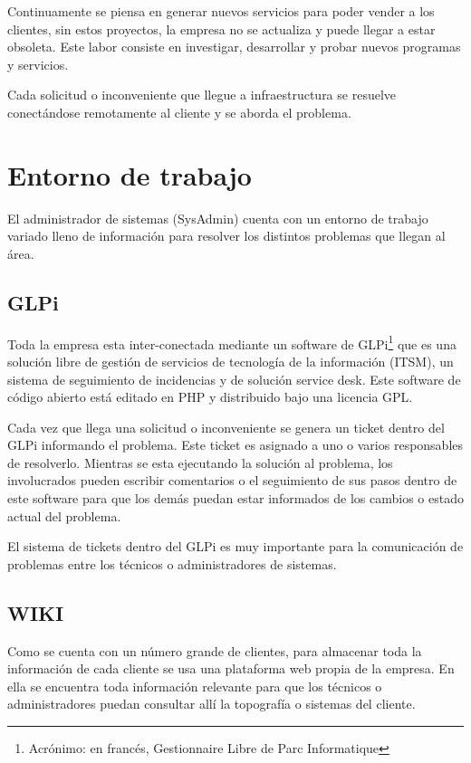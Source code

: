 \documentclass[12pt,a4paper]{article}
\begin{document}
Continuamente se piensa en generar nuevos servicios para poder vender a los clientes, sin estos proyectos, la empresa no se actualiza y puede llegar a estar obsoleta. Este labor consiste en investigar, desarrollar y probar nuevos programas y servicios.

Cada solicitud o inconveniente que llegue a infraestructura se resuelve conectándose remotamente al cliente y se aborda el problema.

\section{Entorno de trabajo}
El administrador de sistemas (SysAdmin) cuenta con un entorno de trabajo variado lleno de información para resolver los distintos problemas que llegan al área.

\subsection{GLPi}
Toda la empresa esta inter-conectada mediante un software de GLPi\footnote{Acrónimo: en francés, Gestionnaire Libre de Parc Informatique}  que es una solución libre de gestión de servicios de tecnología de la información (ITSM), un sistema de seguimiento de incidencias y de solución service desk. Este software de código abierto está editado en PHP y distribuido bajo una licencia GPL. \cite{GLPi}

Cada vez que llega una solicitud o inconveniente se genera un ticket dentro del GLPi informando el problema. Este ticket es asignado a uno o varios responsables de resolverlo. Mientras se esta ejecutando la solución al problema, los involucrados pueden escribir comentarios o el seguimiento de sus pasos dentro de este software para que los demás puedan estar informados de los cambios o estado actual del problema.

El sistema de tickets dentro del GLPi es muy importante para la comunicación de problemas entre los técnicos o administradores de sistemas.  

\subsection{WIKI}
Como se cuenta con un número grande de clientes, para almacenar toda la información de cada cliente se usa una plataforma web propia de la empresa. En ella se encuentra toda información relevante para que los técnicos o administradores puedan consultar allí la topografía o sistemas del cliente. 
\end{document}
